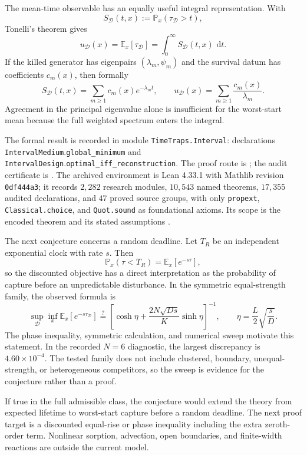 \documentclass[10pt]{article}
\newcommand{\E}{\mathbb E}
\newcommand{\Prob}{\mathbb P}
\newcommand{\dd}{\,\mathrm d}
\begin{document}
The mean-time observable has an equally useful integral representation. With
\[
S_{\mathcal D}(t,x):=\Prob_x(\tau_{\mathcal D}>t),
\]
Tonelli's theorem gives
\[
u_{\mathcal D}(x)=\E_x[\tau_{\mathcal D}]
=\int_0^\infty S_{\mathcal D}(t,x)\,\dd t.
\]
If the killed generator has eigenpairs $(\lambda_m,\psi_m)$ and the survival datum has coefficients $c_m(x)$, then formally
\[
S_{\mathcal D}(t,x)=\sum_{m\geq1}c_m(x)e^{-\lambda_mt},
\qquad
u_{\mathcal D}(x)=\sum_{m\geq1}\frac{c_m(x)}{\lambda_m}.
\]
Agreement in the principal eigenvalue alone is insufficient for the worst-start mean because the full weighted spectrum enters the integral.

The formal result is recorded in module \texttt{TimeTraps.Interval}: declarations \texttt{IntervalMedium}.\texttt{global\_minimum} and \texttt{IntervalDesign}.\texttt{optimal\_iff\_reconstruction}. The proof route is ; the audit certificate is . The archived environment is Lean 4.33.1 with Mathlib revision \texttt{0df444a3}; it records $2{,}282$ research modules, $10{,}543$ named theorems, $17{,}355$ audited declarations, and $47$ proved source groups, with only \texttt{propext}, \texttt{Classical.choice}, and \texttt{Quot.sound} as foundational axioms. Its scope is the encoded theorem and its stated assumptions \cite{Lean4,Mathlib}.

The next conjecture concerns a random deadline. Let $T_R$ be an independent exponential clock with rate $s$. Then
\[
\Prob_x(\tau<T_R)=\E_x[e^{-s\tau}],
\]
so the discounted objective has a direct interpretation as the probability of capture before an unpredictable disturbance. In the symmetric equal-strength family, the observed formula is
\[
\sup_{\mathcal D}\inf_x\E_x[e^{-s\tau_{\mathcal D}}]
\stackrel{?}{=}
\left[
\cosh\eta+
\frac{2N\sqrt{Ds}}{K}\sinh\eta
\right]^{-1},
\qquad
\eta=\frac{L}{2}\sqrt{\frac{s}{D}}.
\]
The phase inequality, symmetric calculation, and numerical sweep motivate this statement. In the recorded $N=6$ diagnostic, the largest discrepancy is $4.60\times10^{-4}$. The tested family does not include clustered, boundary, unequal-strength, or heterogeneous competitors, so the sweep is evidence for the conjecture rather than a proof.

If true in the full admissible class, the conjecture would extend the theory from expected lifetime to worst-start capture before a random deadline. The next proof target is a discounted equal-rise or phase inequality including the extra zeroth-order term. Nonlinear sorption, advection, open boundaries, and finite-width reactions are outside the current model.
\end{document}
